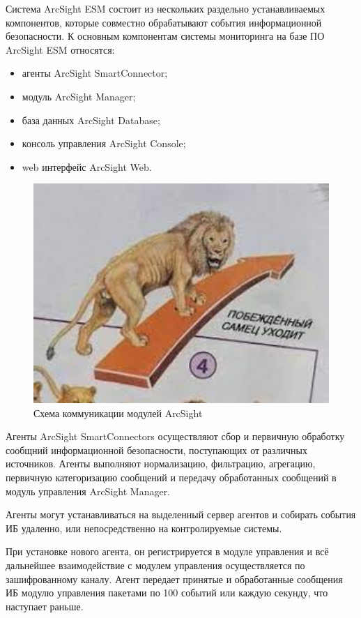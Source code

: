 Система ArcSight ESM состоит из нескольких раздельно устанавливаемых компонентов, которые совместно обрабатывают события информационной безопасности. К основным компонентам системы мониторинга на базе ПО ArcSight ESM относятся:
\begin{itemize}
    \newpage
    \item агенты ArcSight SmartConnector;
    \item модуль ArcSight Manager;
    \item база данных ArcSight Database;
    \item консоль управления ArcSight Console;
    \item web интерфейс ArcSight Web.
\end{itemize}

\begin{figure}[H]
  \centering
  \includegraphics[width=1\textwidth]{image/13.jpg}
  \caption{Схема коммуникации модулей ArcSight}
  \label{comm}
\end{figure}

Агенты ArcSight SmartConnectors осуществляют сбор и первичную обработку сообщний информационной безопасности, поступающих от различных источников. Агенты выполняют нормализацию, фильтрацию, агрегацию, первичную категоризацию сообщений и передачу обработанных сообщений в модуль управления ArcSight Manager.

Агенты могут устанавливаться на выделенный сервер агентов и собирать события ИБ удаленно, или непосредственно на контролируемые системы.

При установке нового агента, он регистрируется в модуле управления и всё дальнейшее взаимодействие с модулем управления осуществляется по зашифрованному каналу. Агент передает принятые и обработанные сообщения ИБ модулю управления пакетами по 100 событий или каждую секунду, что наступает раньше.

